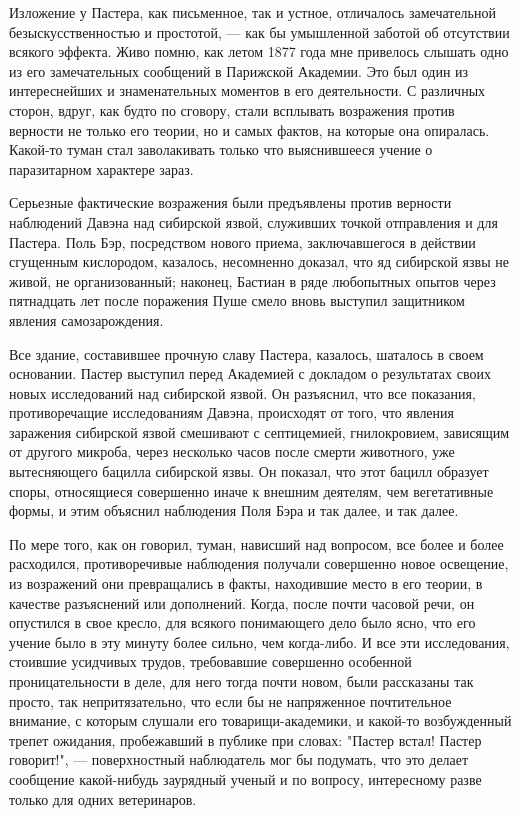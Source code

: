 Изложение  у  Пастера,  как   письменное,  так  и  устное,  отличалось
замечательной безыскусственностью  и простотой, --- как  бы умышленной
заботой об отсутствии всякого эффекта. Живо помню, как летом 1877 года
мне привелось слышать одно из  его замечательных сообщений в Парижской
Академии. Это  был один из  интереснейших и знаменательных  моментов в
его деятельности.  С различных  сторон, вдруг,  как будто  по сговору,
стали всплывать  возражения против верности  не только его  теории, но
и  самых  фактов,  на  которые  она  опиралась.  Какой-то  туман  стал
заволакивать только  что выяснившееся учение о  паразитарном характере
зараз.

Серьезные  фактические  возражения  были предъявлены  против  верности
наблюдений Давэна над сибирской  язвой, служивших точкой отправления и
для  Пастера. Поль  Бэр, посредством  нового приема,  заключавшегося в
действии сгущенным  кислородом, казалось,  несомненно доказал,  что яд
сибирской язвы  не живой, не  организованный; наконец, Бастиан  в ряде
любопытных  опытов через  пятнадцать  лет после  поражения Пуше  смело
вновь выступил защитником явления самозарождения.

Все  здание, составившее  прочную  славу  Пастера, казалось,  шаталось
в  своем  основании.  Пастер   выступил  перед  Академией  с  докладом
о  результатах  своих  новых  исследований  над  сибирской  язвой.  Он
разъяснил,  что все  показания,  противоречащие исследованиям  Давэна,
происходят от  того, что  явления заражения сибирской  язвой смешивают
с  септицемией,  гнилокровием,  зависящим от  другого  микроба,  через
несколько  часов  после  смерти животного,  уже  вытесняющего  бацилла
сибирской  язвы.   Он  показал,   что  этот  бацилл   образует  споры,
относящиеся  совершенно иначе  к  внешним  деятелям, чем  вегетативные
формы, и этим объяснил наблюдения Поля Бэра и так далее, и так далее.

По мере того, как он говорил,  туман, нависший над вопросом, все более
и  более  расходился,  противоречивые наблюдения  получали  совершенно
новое освещение,  из возражений  они превращались в  факты, находившие
место  в его  теории, в  качестве разъяснений  или дополнений.  Когда,
после  почти часовой  речи, он  опустился в  свое кресло,  для всякого
понимающего  дело  было  ясно,  что  его  учение  было  в  эту  минуту
более  сильно,  чем  когда-либо.  И  все  эти  исследования,  стоившие
усидчивых трудов, требовавшие  совершенно особенной проницательности в
деле,  для него  тогда почти  новом, были  рассказаны так  просто, так
непритязательно,  что если  бы не  напряженное почтительное  внимание,
с  которым слушали  его  товарищи-академики,  и какой-то  возбужденный
трепет  ожидания, пробежавший  в  публике при  словах: "Пастер  встал!
Пастер говорит!",  --- поверхностный наблюдатель мог  бы подумать, что
это  делает  сообщение какой-нибудь  заурядный  ученый  и по  вопросу,
интересному разве только для одних ветеринаров.

